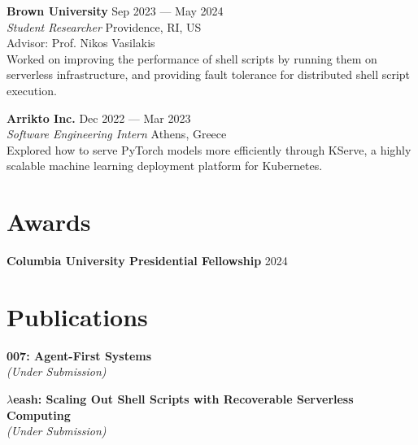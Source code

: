\documentclass[margin, 12pt]{resume}
\newcommand{\cvName}{Nikos Pagonas}
\newcommand{\authors}[1]{#1\xspace}
\newcommand{\equalContributionNote}{(*equal contribution)\xspace}
\newcommand{\fellowship}[1]{\textbf{#1}\xspace}
\newcommand{\stitle}[1]{#1:\xspace}
\newcommand{\institution}[1]{\textbf{#1}\xspace}
\newcommand{\interval}[2]{#1 --- #2\xspace}
\newcommand{\paperTitle}[1]{\textbf{#1}\xspace}
\newcommand{\place}[1]{#1\xspace}
\newcommand{\role}[1]{\textit{#1}\xspace}
\newcommand{\underSubmission}{\textit{(Under Submission)}\xspace}
\newcommand{\venue}[1]{\textit{#1}\xspace}
\begin{document}
\begin{resume}
    \institution{Brown University} \hfill \interval{Sep 2023}{May 2024} \\
    \role{Student Researcher} \hfill \place{Providence, RI, US} \\
    \stitle{Advisor} Prof. Nikos Vasilakis \\
    Worked on improving the performance of shell scripts by running them on serverless infrastructure, and providing fault tolerance for distributed shell script execution.


    \institution{Arrikto Inc.} \hfill \interval{Dec 2022}{Mar 2023} \\
    \role{Software Engineering Intern} \hfill \place{Athens, Greece} \\
    Explored how to serve PyTorch models more efficiently through KServe, a highly scalable machine learning deployment platform for Kubernetes.

    \section{Awards}

    \fellowship{Columbia University Presidential Fellowship} \hfill 2024

    \section{Publications}

    \newcommand{\me}{\textbf{\cvName}\xspace}

    \paperTitle{007: Agent-First Systems} \\
    \underSubmission

    \paperTitle{\( \lambda \)eash: Scaling Out Shell Scripts with Recoverable Serverless Computing} \\
    \underSubmission


\end{resume}
\end{document}
